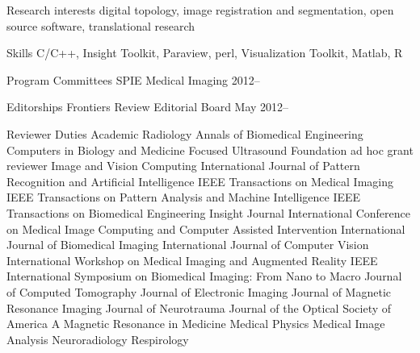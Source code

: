 \documentclass{resume}
\begin{document}

\begin{category}{Research interests}
   \citemnobullet
     digital topology, image registration and segmentation, open source software, translational research
\end{category}


\begin{category}{Skills}
\citemnobullet C/C++, Insight Toolkit, Paraview, perl, Visualization Toolkit, Matlab, R
\end{category}


\begin{category}{Program Committees}
\citemnobullet SPIE Medical Imaging 2012--
\end{category}


\begin{category}{Editorships}
\citemnobullet Frontiers Review Editorial Board May 2012--
\end{category}


\begin{category}{Reviewer Duties}
\citemnobullet Academic Radiology
\citemnobullet Annals of Biomedical Engineering
\citemnobullet Computers in Biology and Medicine
\citemnobullet Focused Ultrasound Foundation ad hoc grant reviewer
\citemnobullet Image and Vision Computing
\citemnobullet International Journal of Pattern Recognition and Artificial Intelligence	
\citemnobullet IEEE Transactions on Medical Imaging
\citemnobullet IEEE Transactions on Pattern Analysis and Machine Intelligence
\citemnobullet IEEE Transactions on Biomedical Engineering
\citemnobullet Insight Journal
\citemnobullet International Conference on Medical Image Computing and Computer Assisted Intervention
\citemnobullet International Journal of Biomedical Imaging
\citemnobullet International Journal of Computer Vision
\citemnobullet International Workshop on Medical Imaging and Augmented Reality
\citemnobullet IEEE International Symposium on Biomedical Imaging:  From Nano to Macro
\citemnobullet Journal of Computed Tomography
\citemnobullet Journal of Electronic Imaging
\citemnobullet Journal of Magnetic Resonance Imaging
\citemnobullet Journal of Neurotrauma
\citemnobullet Journal of the Optical Society of America A
\citemnobullet Magnetic Resonance in Medicine
\citemnobullet Medical Physics
\citemnobullet Medical Image Analysis
\citemnobullet Neuroradiology
\citemnobullet Respirology
\end{category}
\end{document}
